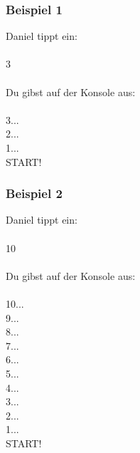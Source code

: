 \documentclass{\VorlagenPfad/coderdojokatext}
\begin{document}
	\subsubsection{Beispiel 1}
	Daniel tippt ein: \\ \\
	3
	\\ \\
	Du gibst auf der Konsole aus: \\ \\
	3... \\
	2... \\
	1... \\
	START!
	
	\subsubsection{Beispiel 2}
	Daniel tippt ein: \\ \\
	10
	\\ \\
	Du gibst auf der Konsole aus: \\ \\
	10... \\
	9... \\
	8... \\
	7... \\
	6... \\
	5... \\
	4... \\
	3... \\
	2... \\
	1... \\
	START!
	
\end{document}
